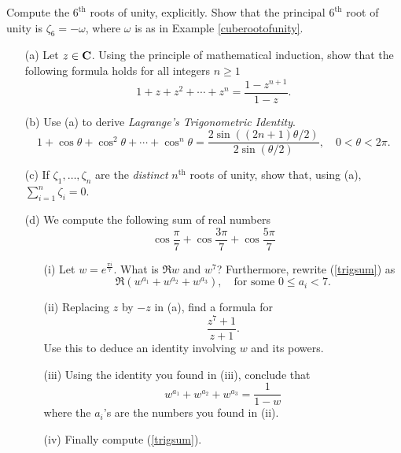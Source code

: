 \vspace*{0.1in}

\begin{problem}\label{prob 3.4}
Compute the $6^{\text{th}}$ roots of unity, explicitly. Show that the principal $6^{\text{th}}$ root of unity is $\zeta_6 = -\omega$, where $\omega$ is as in Example \ref{cuberootofunity}.
\end{problem}

\vspace*{0.1in}

\begin{problem}\label{prob 3.5}\hfill
\begin{itemize}
\item[(a)] Let $z\in \mathbf C$. Using the principle of mathematical induction, show that the following formula holds for all integers $n\geq 1$
\[1 + z + z^2 + \cdots + z^n = \frac{1-z^{n+1}}{1-z}.\]	
\item[(b)] Use (a) to derive \emph{Lagrange's Trigonometric Identity}.
\[1 + \cos\theta + \cos^2\theta + \cdots + \cos^n\theta = \frac{2\sin((2n+1)\theta/2)}{2\sin(\theta/2)},\quad 0 < \theta < 2\pi.\]
\item[(c)] If $\zeta_1,\ldots,\zeta_n$ are the \emph{distinct} $n^{\text{th}}$ roots of unity, show that, using (a), $\displaystyle \sum_{i=1}^n \zeta_i = 0$.
\item[(d)] We compute the following sum of real numbers
\begin{equation*}\label{trigsum}
\cos \frac{\pi}{7} + \cos \frac{3\pi}{7} + \cos \frac{5\pi}{7} \tag{$\dagger$}
\end{equation*}
\begin{itemize}[itemsep=1em]
\item[(i)] Let $w = e^{\frac{\pi i}{7}}$. What is $\Re w$ and $w^7$? Furthermore, rewrite (\ref{trigsum}) as
\[\Re(w^{a_1} + w^{a_2} + w^{a_3}),\quad \text{for some $0 \leq a_i < 7$.}\]
\item[(ii)] Replacing $z$ by $-z$ in (a), find a formula for \[\dfrac{z^7 + 1}{z + 1}.\]
Use this to deduce an identity involving $w$ and its powers.
\item[(iii)] Using the identity you found in (iii), conclude that 
\[w^{a_1} + w^{a_2} + w^{a_3} = \frac{1}{1-w}\]
where the $a_i$'s are the numbers you found in (ii).
\item[(iv)] Finally compute (\ref{trigsum}).
\end{itemize}
\end{itemize}
\end{problem}
